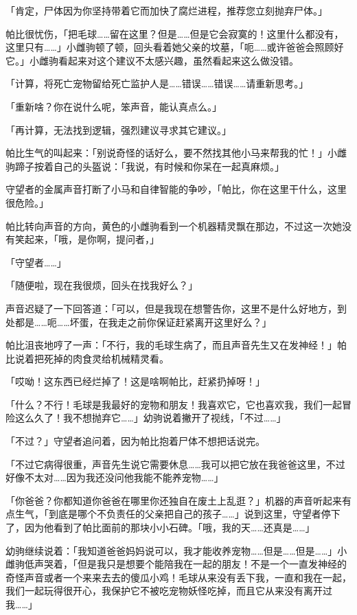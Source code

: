 「{\mt 肯定，尸体因为你坚持带着它而加快了腐烂进程，推荐您立刻抛弃尸体。}」

帕比很忧伤，「把毛球……留在这里？但是……但是它会寂寞的！这里什么都没有，这里只有……」小雌驹顿了顿，回头看着她父亲的坟墓，「呃……或许爸爸会照顾好它。」小雌驹看起来对这个建议不太感兴趣，虽然看起来这么做没错。

「{\mt 计算，将死亡宠物留给死亡监护人是……错误……错误……请重新思考。}」

「重新啥？你在说什么呢，笨声音，能认真点么。」

「{\mt 再计算，无法找到逻辑，强烈建议寻求其它建议。}」

帕比生气的叫起来：「别说奇怪的话好么，要不然找其他小马来帮我的忙！」小雌驹蹄子按着自己的头盔说：「我说，有时候和你呆在一起真麻烦。」

守望者的金属声音打断了小马和自律智能的争吵，「帕比，你在这里干什么，这里很危险。」

帕比转向声音的方向，黄色的小雌驹看到一个机器精灵飘在那边，不过这一次她没有笑起来，「哦，是你啊，提问者，」

「守望者……」

「随便啦，现在我很烦，回头在找我好么？」

声音迟疑了一下回答道：「可以，但是我现在想警告你，这里不是什么好地方，到处都是……呃……坏蛋，在我走之前你保证赶紧离开这里好么？」

帕比沮丧地哼了一声：「不行，我的毛球生病了，而且声音先生又在发神经！」帕比说着把死掉的肉食灵给机械精灵看。

「哎呦！这东西已经烂掉了！这是啥啊帕比，赶紧扔掉呀！」

「什么？不行！毛球是我最好的宠物和朋友！我喜欢它，它也喜欢我，我们一起冒险这么久了！我不想抛弃它……」幼驹说着撇开了视线，「不过……」

「不过？」守望者追问着，因为帕比抱着尸体不想把话说完。

「不过它病得很重，声音先生说它需要休息……我可以把它放在我爸爸这里，不过好像不太对……因为我还没问他我能不能养宠物……」

「你爸爸？你都知道你爸爸在哪里你还独自在废土上乱逛？」机器的声音听起来有点生气，「到底是哪个不负责任的父亲把自己的孩子……」说到这里，守望者停下了，因为他看到了帕比面前的那块小小石碑。「哦，我的天……还真是……」

幼驹继续说着：「我知道爸爸妈妈说可以，我才能收养宠物……但是……但是……」小雌驹低声哭着，「但是我只是想要个能陪我在一起的朋友！不是一个一直发神经的奇怪声音或者一个来来去去的傻瓜小鸡！毛球从来没有丢下我，一直和我在一起，我们一起玩得很开心，我保护它不被吃宠物妖怪吃掉，而且它从来没有离开过我……」

